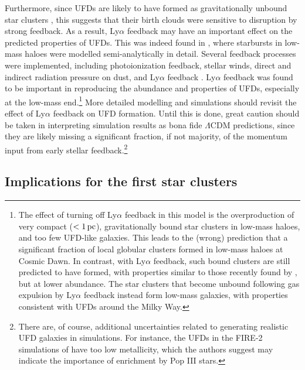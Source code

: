 \documentclass[fleqn,usenatbib]{mnras}
\begin{document}
Furthermore, since UFDs are likely to have formed as gravitationally unbound star clusters \citep{Ricotti2016, Nebrin2022, Garcia2023}, this suggests that their birth clouds were sensitive to disruption by strong feedback. As a result, Ly$\alpha$ feedback may have an important effect on the predicted properties of UFDs. This was indeed found in \cite{Nebrin2022}, where starbursts in low-mass haloes were modelled semi-analytically in detail. Several feedback processes were implemented, including photoionization feedback, stellar winds, direct and indirect radiation pressure on dust, and Ly$\alpha$ feedback \citep[following][]{Tomaselli2021}. Ly$\alpha$ feedback was found to be important in reproducing the abundance and properties of UFDs, especially at the low-mass end.\footnote{The effect of turning off Ly$\alpha$ feedback in this model is the overproduction of very compact ($< 1 \, \rm pc$), gravitationally bound star clusters in low-mass haloes, and too few UFD-like galaxies. This leads to the (wrong) prediction that a significant fraction of local globular clusters formed in low-mass haloes at Cosmic Dawn. In contrast, with Ly$\alpha$ feedback, such bound clusters are still predicted to have formed, with properties similar to those recently found by \cite{Adamo2024}, but at lower abundance. The star clusters that become unbound following gas expulsion by Ly$\alpha$ feedback instead form low-mass galaxies, with properties consistent with UFDs around the Milky Way. } More detailed modelling and simulations should revisit the effect of Ly$\alpha$ feedback on UFD formation. Until this is done, great caution should be taken in interpreting simulation results as bona fide $\Lambda$CDM predictions, since they are likely missing a significant fraction, if not majority, of the momentum input from early stellar feedback.\footnote{There are, of course, additional uncertainties related to generating realistic UFD galaxies in simulations. For instance, the UFDs in the FIRE-2 simulations of \cite{Wheeler2019} have too low metallicity, which the authors suggest may indicate the importance of enrichment by Pop III stars. }


\subsection{Implications for the first star clusters}
\end{document}
